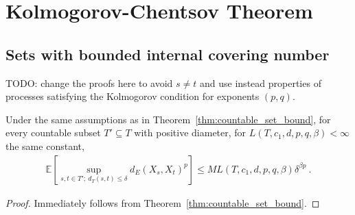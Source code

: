 














\section{Kolmogorov-Chentsov Theorem}


\subsection{Sets with bounded internal covering number}

TODO: change the proofs here to avoid $s \ne t$ and use instead properties of processes satisfying the Kolmogorov condition for exponents $(p,q)$.



















\begin{corollary}\label{cor:countable_set_bound_of_le}
Under the same assumptions as in Theorem~\ref{thm:countable_set_bound}, for every countable subset $T' \subseteq T$ with positive diameter, for $L(T, c_1, d, p, q, \beta) < \infty$ the same constant,
\begin{align*}
  \mathbb{E}\left[ \sup_{s, t \in T';\: d_T(s, t) \le \delta} d_E(X_s, X_t)^p \right]
  \le M L(T, c_1, d, p, q, \beta) \delta^{\beta p}
  \: .
\end{align*}
\end{corollary}

\begin{proof}
Immediately follows from Theorem~\ref{thm:countable_set_bound}.
\end{proof}


